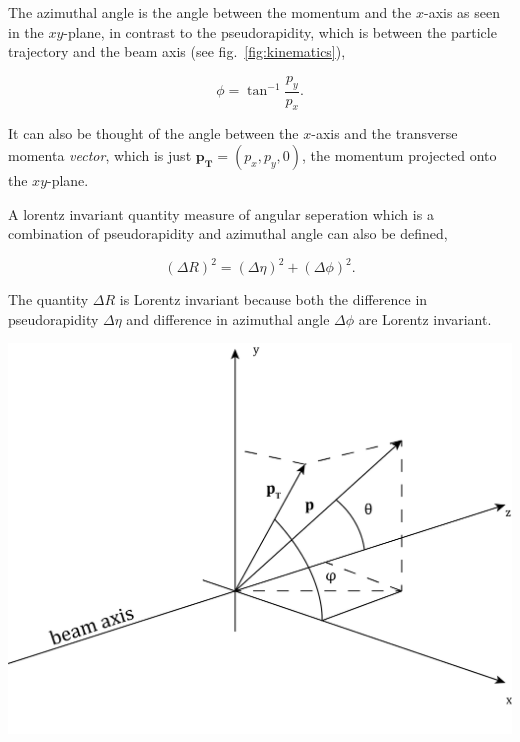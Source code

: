 \documentclass[11pt]{amsart}
\newenvironment{Figure}
  {\par\medskip\noindent\minipage{\linewidth}}
  {\endminipage\par\medskip}
\begin{document}
\begin{multicols}{2}
The azimuthal angle is the angle between the momentum and the $x$-axis as seen in the $xy$-plane, in contrast to the pseudorapidity, which is between the particle trajectory and the beam axis (see fig.~\ref{fig:kinematics}),

\begin{equation}
  \label{eq:azimuthal}
  \phi = \tan^{-1} \frac{p_y}{p_x}.
\end{equation}

It can also be thought of the angle between the $x$-axis and the transverse momenta \textit{vector}, which is just $\mathbf{p_T} = (p_x, p_y, 0)$, the momentum projected onto the $xy$-plane.

A lorentz invariant quantity measure of angular seperation which is a combination of pseudorapidity and azimuthal angle can also be defined,

\begin{equation}
  \label{eq:angular}
  {(\Delta R)}^2 = {(\Delta \eta)}^2 + {(\Delta \phi)}^2.
\end{equation}

The quantity $\Delta R$ is Lorentz invariant because both the difference in pseudorapidity $\Delta \eta$ and difference in azimuthal angle $\Delta \phi$ are Lorentz invariant. \cite{lorentz}

\begin{Figure}
  \centering
  \includegraphics[width=\linewidth]{kinematics}
  \label{fig:kinematics}
\end{Figure}


\end{multicols}
\end{document}
